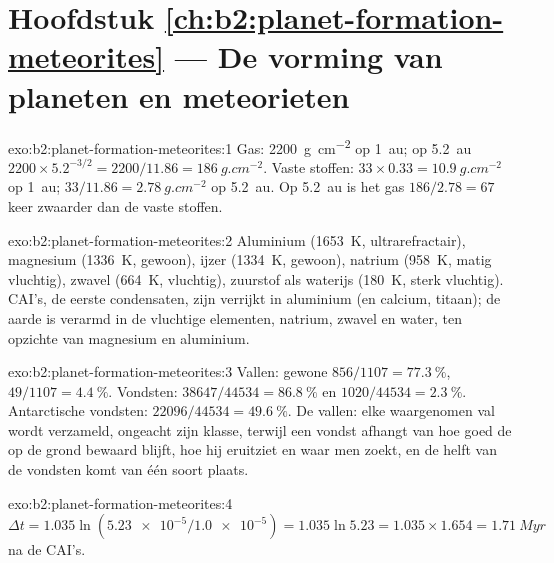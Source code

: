 \section*{Hoofdstuk \ref{ch:b2:planet-formation-meteorites} --- De vorming van planeten en meteorieten}

\begin{solution}{exo:b2:planet-formation-meteorites:1}
Gas: \qty{2200}{g.cm^{-2}} op \qty{1}{au}; op \qty{5.2}{au}
$2200\times5.2^{-3/2} = 2200/11.86 = \qty{186}{g.cm^{-2}}$. Vaste stoffen:
$33\times0.33 = \qty{10.9}{g.cm^{-2}}$ op \qty{1}{au};
$33/11.86 = \qty{2.78}{g.cm^{-2}}$ op \qty{5.2}{au}. Op \qty{5.2}{au} is het gas
$186/2.78 = 67$ keer zwaarder dan de vaste stoffen.
\end{solution}

\begin{solution}{exo:b2:planet-formation-meteorites:2}
Aluminium (\qty{1653}{K}, ultrarefractair), magnesium (\qty{1336}{K}, gewoon),
ijzer (\qty{1334}{K}, gewoon), natrium (\qty{958}{K}, matig vluchtig), zwavel
(\qty{664}{K}, vluchtig), zuurstof als waterijs (\qty{180}{K}, sterk vluchtig).
CAI's, de eerste condensaten, zijn verrijkt in aluminium (en calcium, titaan);
de aarde is verarmd in de vluchtige elementen, natrium, zwavel en water, ten opzichte van
magnesium en aluminium.
\end{solution}

\begin{solution}{exo:b2:planet-formation-meteorites:3}
Vallen: gewone  $856/1107 = \qty{77.3}{\percent}$, 
$49/1107 = \qty{4.4}{\percent}$. Vondsten: $38647/44534 = \qty{86.8}{\percent}$ en
$1020/44534 = \qty{2.3}{\percent}$. Antarctische vondsten: $22096/44534 =
\qty{49.6}{\percent}$. De vallen: elke waargenomen val wordt verzameld, ongeacht zijn
klasse, terwijl een vondst afhangt van hoe goed de  op de grond bewaard blijft,
hoe hij eruitziet en waar men zoekt, en de helft van de vondsten komt van één soort
plaats.
\end{solution}

\begin{solution}{exo:b2:planet-formation-meteorites:4}
$\Delta t = 1.035\ln(\num{5.23e-5}/\num{1.0e-5}) = 1.035\ln 5.23 =
1.035\times1.654 = \qty{1.71}{Myr}$ na de CAI's.
\end{solution}

